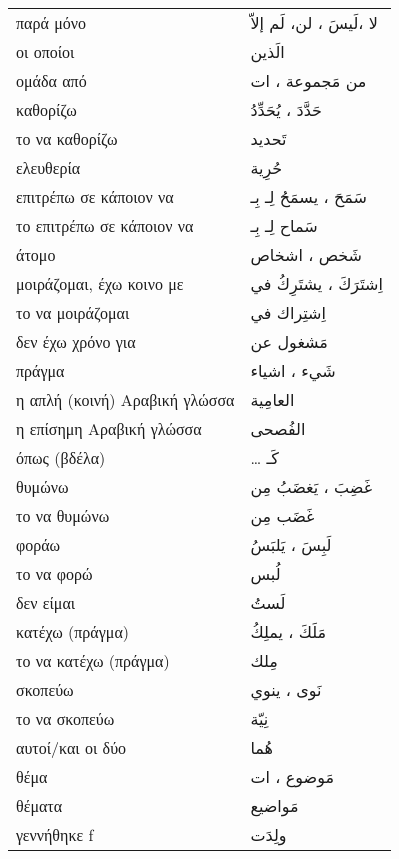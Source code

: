 \documentclass[twocolumn,a4paper]{article}
\newcommand{\ar}[1]{\textarabic{#1}}
\newcommand{\pl}{\raisebox{0.15ex}{\footnotesize ◍}}
\newcommand{\normpl}[1]{\ar{ #1، ات }}
\newcommand{\vrf}{\raisebox{0.15ex}{\footnotesize ◉}}
\newcommand{\vr}{\raisebox{0.15ex}{\footnotesize ◎}}
\newcommand{\mas}{\raisebox{0.15ex}{\footnotesize ◫}}
\begin{document}
\begin{mpsupertabular}{ P{0.5\textwidth} P{0.5\textwidth} }
παρά μόνο                    & \ar{ لا ،لَيسَ ، لن، لَم إلاّ } \\
οι οποίοι                    & \ar{ الَذين } \\
ομάδα από \pl                & \ar{من} \normpl{ مَجموعة } \\
καθορίζω \vrf                & \ar{ حَدَّدَ ، يُحَدِّدُ } \\ %
το να καθορίζω \mas          & \ar{ تَحديد } \\
ελευθερία                    & \ar{ حُرِية } \\
επιτρέπω σε κάποιον να \vrf  & \ar{ سَمَحَ ، يسمَحُ لِـ بِـ } \\
το επιτρέπω σε κάποιον να \mas & \ar{ سَماح لِـ بِـ } \\
άτομο \pl                    & \ar{ شَخص ، اشخاص } \\
μοιράζομαι, έχω κοινο με \vrf & \ar{ اِشتَرَكَ ، يشتَرِكُ في } \\ %
το να μοιράζομαι \mas        & \ar{ اِشتِراك في } \\
δεν έχω χρόνο για            & \ar{ مَشغول عن } \\
πράγμα \pl                   & \ar{ شَيء ، اشياء } \\
η απλή (κοινή) Αραβική γλώσσα & \ar{ العامِية } \\
η επίσημη Αραβική γλώσσα     & \ar{ الفُصحى } \\
όπως (βδέλα)                 & \ldots\ar{ كَـ } \\
θυμώνω \vrf                  & \ar{ غَضِبَ ، يَغضَبُ مِن }  \\ %
το να θυμώνω \mas            & \ar{ غَضَب مِن } \\
φοράω \vrf                   & \ar{ لَبِسَ ، يَلبَسُ } \\ %
το να φορώ \mas              & \ar{ لُبس } \\
δεν είμαι \vr                & \ar{ لَستُ } \\
κατέχω (πράγμα)  \vrf        & \ar{ مَلَكَ ، يملِكُ } \\
το να κατέχω (πράγμα) \mas   & \ar{ مِلك } \\
σκοπεύω \vrf                 & \ar{ نَوى ، ينوي } \\
το να σκοπεύω \mas           & \ar{ نِيّة } \\
αυτοί/και οι δύο             & \ar{ هُما } \\
θέμα \pl                     & \normpl{ مَوضوع } \\
θέματα                       & \ar{ مَواضيع } \\
γεννήθηκε f \vr              & \ar{ ولِدَت } \\


\end{mpsupertabular}
\end{document}
